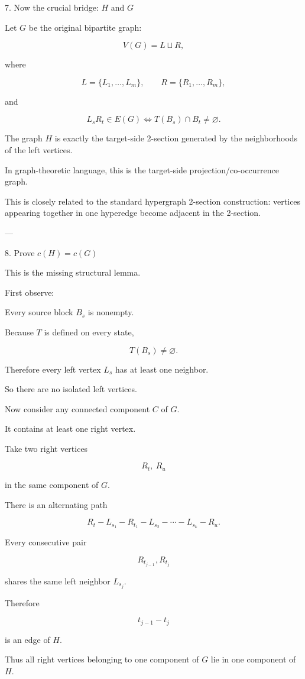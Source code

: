 7. Now the crucial bridge: \(H\) and \(G\)

Let \(G\) be the original bipartite graph:

\[
V(G)=L\sqcup R,
\]

where

\[
L=\{L_1,\ldots,L_m\},
\qquad
R=\{R_1,\ldots,R_m\},
\]

and

\[
L_sR_t\in E(G)
\iff
T(B_s)\cap B_t\neq\varnothing.
\]

The graph \(H\) is exactly the target-side 2-section generated by the neighborhoods of the left vertices.

In graph-theoretic language, this is the target-side projection/co-occurrence graph.

This is closely related to the standard hypergraph 2-section construction: vertices appearing together in one hyperedge become adjacent in the 2-section. 


---

8. Prove \(c(H)=c(G)\)

This is the missing structural lemma.

First observe:

Every source block \(B_s\) is nonempty.

Because \(T\) is defined on every state,

\[
T(B_s)\neq\varnothing.
\]

Therefore every left vertex \(L_s\) has at least one neighbor.

So there are no isolated left vertices.

Now consider any connected component \(C\) of \(G\).

It contains at least one right vertex.

Take two right vertices

\[
R_t,\ R_u
\]

in the same component of \(G\).

There is an alternating path

\[
R_t-L_{s_1}-R_{t_1}-L_{s_2}
-\cdots-L_{s_k}-R_u.
\]

Every consecutive pair

\[
R_{t_{j-1}},R_{t_j}
\]

shares the same left neighbor \(L_{s_j}\).

Therefore

\[
t_{j-1}-t_j
\]

is an edge of \(H\).

Thus all right vertices belonging to one component of \(G\) lie in one component of \(H\).

